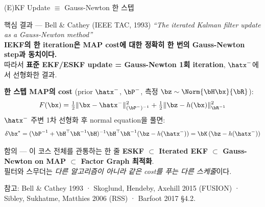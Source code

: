 \begin{frame}[shrink=20]{(E)KF Update $\equiv$ Gauss-Newton 한 스텝}
  \begin{block}{핵심 결과 — Bell \& Cathey (IEEE TAC, 1993)}
    \emph{``The iterated Kalman filter update as a Gauss-Newton method''}\\[0.2em]
    \textbf{IEKF의 한 iteration은 MAP cost에 대한 정확히 한 번의 Gauss-Newton step과 동치이다.}\\
    따라서 \textbf{표준 EKF/ESKF update = Gauss-Newton 1회 iteration}, $\hatx^-$에서 선형화한 결과.
  \end{block}

  \pause
  \vspace{0.3em}
  \textbf{한 스텝 MAP의 cost} (prior $\hatx^-$, $\bP^-$, 측정 $\bz \sim \Norm{\bH\bx}{\bR}$):
  \[
    F(\bx) = \tfrac12\|\bx - \hatx^-\|^2_{(\bP^-)^{-1}} + \tfrac12\|\bz - h(\bx)\|^2_{\bR^{-1}}
  \]
  \pause
  $\hatx^-$ 주변 1차 선형화 후 normal equation을 풀면:
  \[
    \delta\bx^* = (\bP^{-1} + \bH^\top\bR^{-1}\bH)^{-1}\bH^\top\bR^{-1}(\bz - h(\hatx^-))
                = \bK\,(\bz - h(\hatx^-))
  \]
  \pause
  \begin{alertblock}{함의 — 이 코스 전체를 관통하는 한 줄}
    \textbf{ESKF $\subset$ Iterated EKF $\subset$ Gauss-Newton on MAP $\subset$ Factor Graph 최적화}.\\
    필터와 스무더는 \emph{다른 알고리즘이 아니라 같은 cost를 푸는 다른 스케줄}이다.
  \end{alertblock}

  \vspace{0.2em}
  \scriptsize 참고: Bell \& Cathey 1993 · Skoglund, Hendeby, Axehill 2015 (FUSION) · Sibley, Sukhatme, Matthies 2006 (RSS) · Barfoot 2017 §4.2.
\end{frame}

